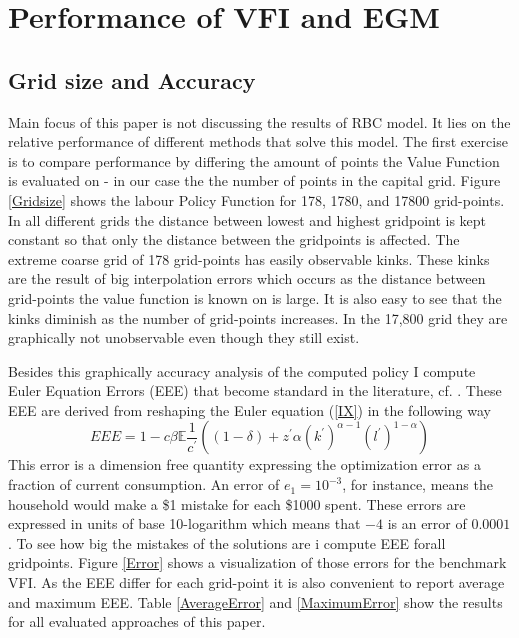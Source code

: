 \documentclass[a4paper,12pt]{article}
\begin{document}
\section*{Performance of VFI and EGM}

\subsection*{Grid size and Accuracy}

Main focus of this paper is not discussing the results of RBC model. It lies on the relative performance of different methods that solve this model. The first exercise is to compare performance by differing the amount of points the Value Function is evaluated on - in our case the the number of points in the capital grid. Figure \ref{Gridsize} shows the labour Policy Function for 178, 1780, and 17800 grid-points. In all different grids the distance between lowest and highest gridpoint is kept constant so that only the distance between the gridpoints is affected. The extreme coarse grid of 178 grid-points has easily observable kinks. These kinks are the result of big interpolation errors which occurs as the distance between grid-points the value function is known on is large. It is also easy to see that the kinks diminish as the number of grid-points increases. In the 17,800 grid they are graphically not unobservable even though they still exist.

Besides this graphically accuracy analysis of the computed policy I compute Euler Equation Errors (EEE) that become standard in the literature, cf. . These EEE are derived from reshaping the Euler equation (\ref{IX}) in the following way
\begin{equation*}
EEE=1-c\beta \mathbb{E}\frac{1}{c^{\prime }}\left( \left( 1-\delta \right)+z^{\prime }\alpha \left( k^{\prime }\right) ^{\alpha -1}\left( l^{\prime}\right) ^{1-\alpha }\right) 
\label{EEE}
\end{equation*}
This error is a dimension free quantity expressing the optimization error as a fraction of current consumption. An error of $e_{1}=10^{-3}$, for instance, means the household would make a \$1 mistake for each \$1000 spent. These errors are expressed in units of base 10-logarithm which means that $-4$ is an error of $0.0001$. To see how big the mistakes of the solutions are i compute EEE forall gridpoints. Figure \ref{Error} shows a visualization of those errors for the benchmark VFI. As the EEE differ for each grid-point it is also convenient to report average and maximum EEE. Table \ref{AverageError} and \ref{MaximumError} show the results for all evaluated approaches of this paper.
\end{document}
